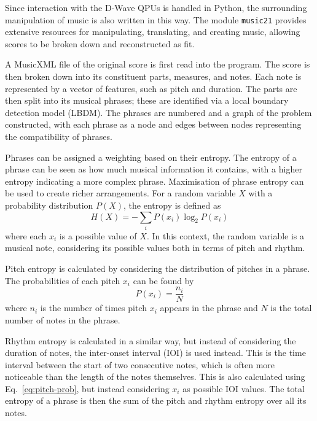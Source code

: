 \documentclass[aps,pra,10pt,twocolumn]{revtex4-2}
\begin{document}
Since interaction with the D-Wave QPUs is handled in Python, the surrounding manipulation of music is also written in this way. The module \verb|music21| provides extensive resources for manipulating, translating, and creating music, allowing scores to be broken down and reconstructed as fit.

A MusicXML file of the original score is first read into the program. The score is then broken down into its constituent parts, measures, and notes. Each note is represented by a vector of features, such as pitch and duration. The parts are then split into its musical phrases; these are identified via a local boundary detection model (LBDM). The phrases are numbered and a graph of the problem constructed, with each phrase as a node and edges between nodes representing the compatibility of phrases.

Phrases can be assigned a weighting based on their entropy. The entropy of a phrase can be seen as how much musical information it contains, with a higher entropy indicating a more complex phrase. Maximisation of phrase entropy can be used to create richer arrangements. For a random variable $X$ with a probability distribution $P(X)$, the entropy is defined as
\begin{equation}
    H(X)=-\sum_i P(x_i)\log_2 P(x_i)
    \label{eq:entropy}
\end{equation}
where each $x_i$ is a possible value of $X$. In this context, the random variable is a musical note, considering its possible values both in terms of pitch and rhythm.

Pitch entropy is calculated by considering the distribution of pitches in a phrase. The probabilities of each pitch $x_i$ can be found by
\begin{equation}
    P(x_i)=\frac{n_i}{N}
    \label{eq:pitch-prob}
\end{equation}
where $n_i$ is the number of times pitch $x_i$ appears in the phrase and $N$ is the total number of notes in the phrase.

Rhythm entropy is calculated in a similar way, but instead of considering the duration of notes, the inter-onset interval (IOI) is used instead. This is the time interval between the start of two consecutive notes, which is often more noticeable than the length of the notes themselves. This is also calculated using Eq.\ \ref{eq:pitch-prob}, but instead considering $x_i$ as possible IOI values.
The total entropy of a phrase is then the sum of the pitch and rhythm entropy over all its notes. 
\end{document}
